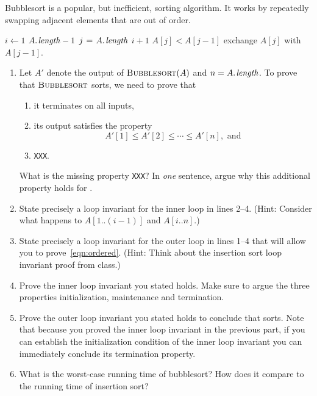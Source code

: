 \documentclass[11pt]{article}
\theoremstyle{nonumberplain}
\begin{document}
Bubblesort is a popular, but inefficient, sorting algorithm.  It works
by repeatedly swapping adjacent elements that are out of order.

\begin{codebox}
\li \For $i \gets 1$ \To $\attrib{A}{length} - 1$ \Do
\li     \For $j \gets \attrib{A}{length}$ \Downto $i + 1$ \Do
\li         \If $A[j] < A[j-1]$ \Do
\li             exchange $A[j]$ with $A[j-1]$.
            \End
        \End
    \End
\end{codebox}

\begin{enumerate} 
\item Let $A'$ denote the output of $\textnormal{\scshape Bubblesort}(A)$ and $n =
  \attrib{A}{length}$.  To prove that $\textnormal{\scshape Bubblesort}$ sorts, we
  need to prove that
  \begin{enumerate}
  \item it terminates on all inputs,
  \item its output satisfies the property
    \begin{equation}
      A'[1] \le A'[2] \le \cdots \le A'[n], \text{ and}\label{eqn:ordered}
    \end{equation}
  \item \texttt{XXX}.
  \end{enumerate}
  What is the missing property \texttt{XXX}?  In \emph{one} sentence,
  argue why this additional property holds for .
  
\item State precisely a loop invariant for the inner \For loop in
  lines 2--4.  (Hint: Consider what happens to $A[1..(i-1)]$ and
  $A[i..n]$.)

\item State precisely a loop invariant for the outer \For loop in
  lines 1--4 that will allow you to prove~\eqref{eqn:ordered}.  (Hint:
  Think about the insertion sort loop invariant proof from class.)

\item Prove the inner loop invariant you stated holds.  Make sure to
  argue the three properties initialization, maintenance and
  termination.
  
\item Prove the outer loop invariant you stated holds to conclude that
   sorts.  Note that because you proved the inner
  loop invariant in the previous part, if you can establish the
  initialization condition of the inner loop invariant you can
  immediately conclude its termination property. 

\item What is the worst-case running time of bubblesort?  How does it
  compare to the running time of insertion sort?
\end{enumerate}
\end{document}
